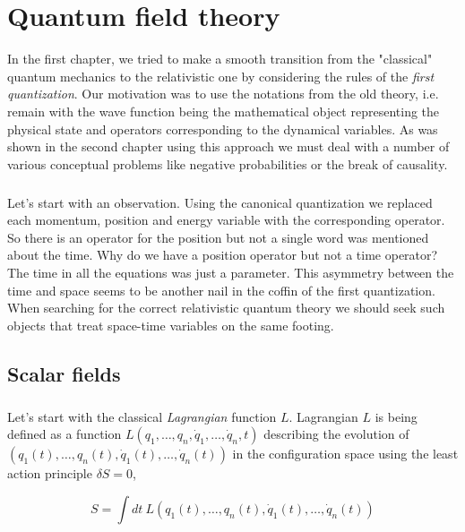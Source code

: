 \chapter{Quantum field theory}

In the first chapter, we tried to make a smooth transition from the "classical" quantum mechanics
to the relativistic one by considering the rules of the \textit{first quantization}. Our motivation
was to use the notations from the old theory, i.e. remain with the wave function being the
mathematical object representing the physical state and operators corresponding to the dynamical 
variables. As was shown in the second chapter using this approach we must deal with a number of
various conceptual problems like negative probabilities or the break of causality. 

\paragraph{} Let's start with an observation. Using the canonical quantization we replaced each momentum, position
and energy variable with the corresponding operator. So there is an operator for the position
but not a single word was mentioned about the time. Why do we have a position operator but not a
time operator? The time in all the equations was just a parameter. This asymmetry between the time
and space seems to be another nail in the coffin of the first quantization. When searching for
the correct relativistic quantum theory we should seek such objects that treat space-time variables
on the same footing. 

\section{Scalar fields}

\paragraph{} Let's start with the classical \textit{Lagrangian} function $L$. Lagrangian $L$ is being defined as a 
function $L(q_{1}, \dots, q_{n}, \dot{q}_{1}, \dots, \dot{q}_{n}, t)$ describing the evolution of 
$(q_{1}(t), \dots, q_{n}(t), \dot{q}_{1}(t), \dots, \dot{q}_{n}(t))$ in the configuration space using the least action 
principle $\delta S = 0$,

\begin{equation}
    \label{eq:action}
    S = \int dt \ L(q_{1}(t), \dots, q_{n}(t), \dot{q}_{1}(t), \dots, \dot{q}_{n}(t))
\end{equation}

